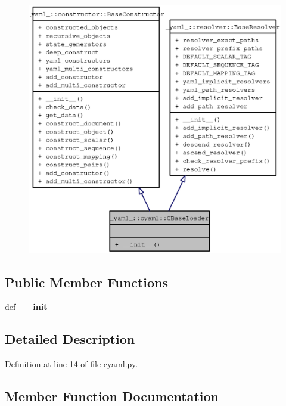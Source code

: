 \begin{figure}[H]
\begin{center}
\leavevmode
\includegraphics[width=400pt]{class__yaml___1_1cyaml_1_1CBaseLoader__coll__graph}
\end{center}
\end{figure}
\subsection*{Public Member Functions}
\begin{CompactItemize}
\item 
def {\bf \_\-\_\-init\_\-\_\-}
\end{CompactItemize}


\subsection{Detailed Description}


Definition at line 14 of file cyaml.py.

\subsection{Member Function Documentation}
